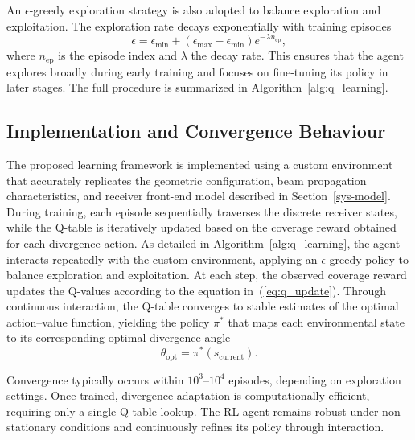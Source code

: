 \documentclass[twocolumn,twoside]{IEEEtran}
\theoremstyle{break}
\begin{document}
An $\epsilon$-greedy exploration strategy is also adopted to balance exploration and exploitation. The exploration rate decays exponentially with training episodes
\begin{equation}
	\epsilon = \epsilon_{\min} + (\epsilon_{\max} - \epsilon_{\min}) e^{-\lambda n_{\text{ep}}},
\end{equation}
where $n_{\text{ep}}$ is the episode index and $\lambda$ the decay rate. This ensures that the agent explores broadly during early training and focuses on fine-tuning its policy in later stages. The full procedure is summarized in Algorithm~\ref{alg:q_learning}.

\subsection{Implementation and Convergence Behaviour}

The proposed learning framework is implemented using a custom environment that accurately replicates the geometric configuration, beam propagation characteristics, and receiver front-end model described in Section~\ref{sys-model}. During training, each episode sequentially traverses the discrete receiver states, while the Q-table is iteratively updated based on the coverage reward obtained for each divergence action.
%
 As detailed in Algorithm~\ref{alg:q_learning}, the agent interacts repeatedly with the custom  environment, applying an $\epsilon$-greedy policy to balance exploration and exploitation. At each step, the observed coverage reward updates the Q-values according to the  equation in~(\ref{eq:q_update}). Through continuous interaction, the Q-table converges to stable estimates of the optimal action–value function, yielding the policy $\pi^{*}$ that maps each environmental state to its corresponding optimal divergence angle
\begin{equation}
	\theta_{\text{opt}} = \pi^{*}(s_{\text{current}}).
\end{equation}

Convergence typically occurs within $10^3$–$10^4$ episodes, depending on exploration settings. Once trained, divergence adaptation is computationally efficient, requiring only a single Q-table lookup. The RL agent remains robust under non-stationary conditions and continuously refines its policy through interaction.
\end{document}
